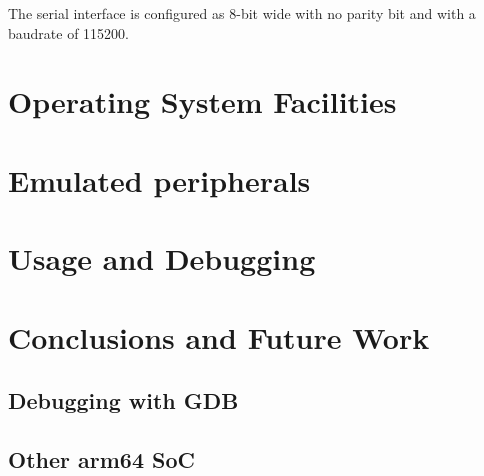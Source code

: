 \documentclass[12pt,a4paper,openright,twoside]{report}
\begin{document}
The serial interface is configured as 8-bit wide with no parity bit and with
a baudrate of 115200.


\clearpage{\pagestyle{empty}\cleardoublepage}
\chapter{Operating System Facilities}

\clearpage{\pagestyle{empty}\cleardoublepage}
\chapter{Emulated peripherals}

\clearpage{\pagestyle{empty}\cleardoublepage}
\chapter{Usage and Debugging}

\clearpage{\pagestyle{empty}\cleardoublepage}
\chapter{Conclusions and Future Work}
\section{Debugging with GDB}
\section{Other arm64 SoC}
\end{document}
